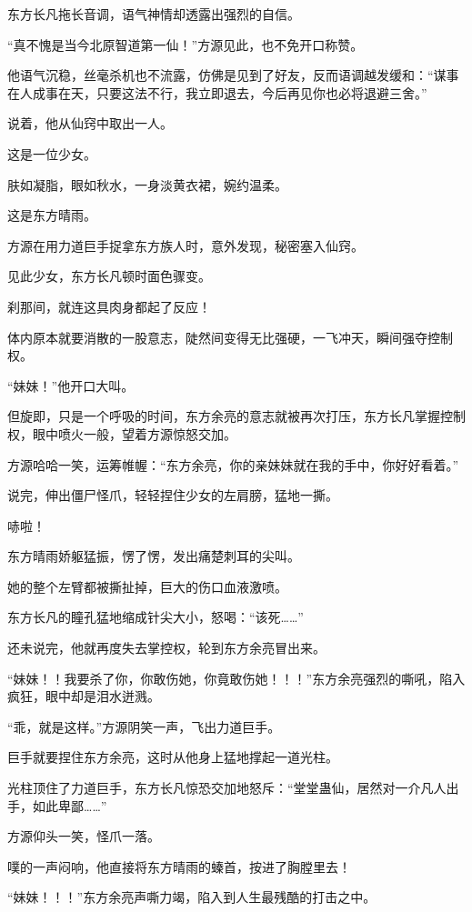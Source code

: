 \begin{this_body}
东方长凡拖长音调，语气神情却透露出强烈的自信。

“真不愧是当今北原智道第一仙！”方源见此，也不免开口称赞。

他语气沉稳，丝毫杀机也不流露，仿佛是见到了好友，反而语调越发缓和：“谋事在人成事在天，只要这法不行，我立即退去，今后再见你也必将退避三舍。”

说着，他从仙窍中取出一人。

这是一位少女。

肤如凝脂，眼如秋水，一身淡黄衣裙，婉约温柔。

这是东方晴雨。

方源在用力道巨手捉拿东方族人时，意外发现，秘密塞入仙窍。

见此少女，东方长凡顿时面色骤变。

刹那间，就连这具肉身都起了反应！

体内原本就要消散的一股意志，陡然间变得无比强硬，一飞冲天，瞬间强夺控制权。

“妹妹！”他开口大叫。

但旋即，只是一个呼吸的时间，东方余亮的意志就被再次打压，东方长凡掌握控制权，眼中喷火一般，望着方源惊怒交加。

方源哈哈一笑，运筹帷幄：“东方余亮，你的亲妹妹就在我的手中，你好好看着。”

说完，伸出僵尸怪爪，轻轻捏住少女的左肩膀，猛地一撕。

哧啦！

东方晴雨娇躯猛振，愣了愣，发出痛楚刺耳的尖叫。

她的整个左臂都被撕扯掉，巨大的伤口血液激喷。

东方长凡的瞳孔猛地缩成针尖大小，怒喝：“该死……”

还未说完，他就再度失去掌控权，轮到东方余亮冒出来。

“妹妹！！我要杀了你，你敢伤她，你竟敢伤她！！！”东方余亮强烈的嘶吼，陷入疯狂，眼中却是泪水迸溅。

“乖，就是这样。”方源阴笑一声，飞出力道巨手。

巨手就要捏住东方余亮，这时从他身上猛地撑起一道光柱。

光柱顶住了力道巨手，东方长凡惊恐交加地怒斥：“堂堂蛊仙，居然对一介凡人出手，如此卑鄙……”

方源仰头一笑，怪爪一落。

噗的一声闷响，他直接将东方晴雨的螓首，按进了胸膛里去！

“妹妹！！！”东方余亮声嘶力竭，陷入到人生最残酷的打击之中。


\end{this_body}
